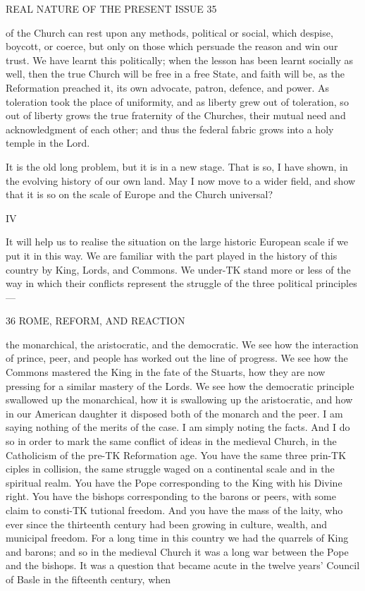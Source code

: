 \documentclass[12pt,a5paper,oneside]{book}
\begin{document}
REAL NATURE OF THE PRESENT ISSUE 35 

of the Church can rest upon any methods, political 
or social, which despise, boycott, or coerce, but only 
on those which persuade the reason and win our trust. 
We have learnt this politically; when the lesson has 
been learnt socially as well, then the true Church will 
be free in a free State, and faith will be, as the 
Reformation preached it, its own advocate, patron, 
defence, and power. As toleration took the place of 
uniformity, and as liberty grew out of toleration, 
so out of liberty grows the true fraternity of the 
Churches, their mutual need and acknowledgment of 
each other; and thus the federal fabric grows into a 
holy temple in the Lord. 

It is the old long problem, but it is in a new stage. 
That is so, I have shown, in the evolving history of 
our own land. May I now move to a wider field, 
and show that it is so on the scale of Europe and the 
Church universal? 



IV 



It will help us to realise the situation on the large 
historic European scale if we put it in this way. We 
are familiar with the part played in the history of this 
country by King, Lords, and Commons. We under-TK
stand more or less of the way in which their conflicts 
represent the struggle of the three political principles---



36 ROME, REFORM, AND REACTION 

the monarchical, the aristocratic, and the democratic. 
We see how the interaction of prince, peer, and 
people has worked out the line of progress. We see 
how the Commons mastered the King in the fate of 
the Stuarts, how they are now pressing for a similar 
mastery of the Lords. We see how the democratic 
principle swallowed up the monarchical, how it is 
swallowing up the aristocratic, and how in our 
American daughter it disposed both of the monarch 
and the peer. I am saying nothing of the merits of 
the case. I am simply noting the facts. And I do 
so in order to mark the same conflict of ideas in the 
medieval Church, in the Catholicism of the pre-TK
Reformation age. You have the same three prin-TK
ciples in collision, the same struggle waged on a 
continental scale and in the spiritual realm. You 
have the Pope corresponding to the King with his 
Divine right. You have the bishops corresponding 
to the barons or peers, with some claim to consti-TK
tutional freedom. And you have the mass of the 
laity, who ever since the thirteenth century had been 
growing in culture, wealth, and municipal freedom. 
For a long time in this country we had the quarrels 
of King and barons; and so in the medieval Church 
it was a long war between the Pope and the bishops. 
It was a question that became acute in the twelve 
years' Council of Basle in the fifteenth century, when 
\end{document}
